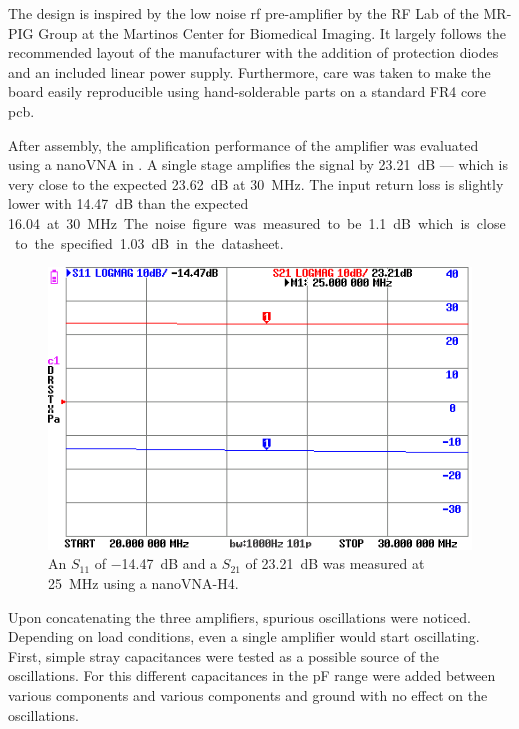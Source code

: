 The design is inspired by the low noise \acrshort{rf} pre-amplifier by the RF Lab of the MR-PIG Group at the Martinos Center for Biomedical Imaging. It largely follows the recommended layout of the manufacturer with the addition of protection diodes and an included linear power supply. Furthermore, care was taken to make the board easily reproducible using hand-solderable parts on a standard FR4 core \acrshort{pcb}.

After assembly, the amplification performance of the amplifier was evaluated using a nanoVNA in . A single stage amplifies the signal by \qty{23.21}{\deci\bel} --- which is very close to the expected \qty{23.62}{\deci\bel} at \qty{30}{\mega\hertz}. The input return loss is slightly lower with \qty{14.47}{\deci\bel} than the expected \qty{16.04} at \qty{30}{\mega\hertz}. The noise figure was measured to be \qty{1.1}{\deci\bel} which is close to the specified \qty{1.03}{\deci\bel} in the datasheet.

\begin{figure}[hbt]
    \centering
    \includegraphics[width=\textwidth]{images/preamp_20DB_25MHz.png}
    \caption{ An \(S_{11}\) of \qty{-14.47}{\deci\bel} and a \(S_{21}\) of \qty{23.21}{\deci\bel} was measured at \qty{25}{\mega\hertz} using a nanoVNA-H4.}
\end{figure}

Upon concatenating the three amplifiers, spurious oscillations were noticed. Depending on load conditions, even a single amplifier would start oscillating. First, simple stray capacitances were tested as a possible source of the oscillations. For this different capacitances in the \unit{\pico\farad} range were added between various components and various components and ground with no effect on the oscillations.


